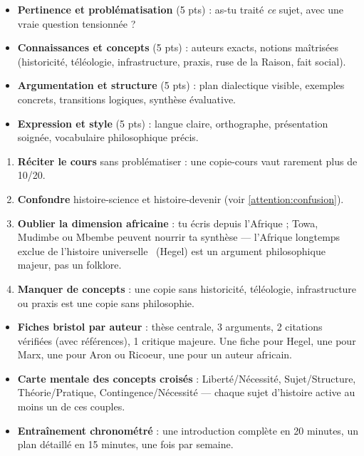 \documentclass[11pt]{article}
\newcommand{\cle}[1]{{\popxbold\color{popdark}#1}}
\begin{document}
\begin{aretenir}
\begin{itemize}
\item \textbf{Pertinence et problématisation} (5 pts) : as-tu traité \emph{ce} sujet, avec une vraie question tensionnée ?
\item \textbf{Connaissances et concepts} (5 pts) : auteurs exacts, notions maîtrisées (\cle{historicité}, \cle{téléologie}, \cle{infrastructure}, \cle{praxis}, \cle{ruse de la Raison}, \cle{fait social}).
\item \textbf{Argumentation et structure} (5 pts) : plan dialectique visible, exemples concrets, transitions logiques, synthèse évaluative.
\item \textbf{Expression et style} (5 pts) : langue claire, orthographe, présentation soignée, vocabulaire philosophique précis.
\end{itemize}
\end{aretenir}

\begin{attention}
\begin{enumerate}
\item \textbf{Réciter le cours} sans problématiser : une copie-cours vaut rarement plus de 10/20.
\item \textbf{Confondre} histoire-science et histoire-devenir (voir \ref{attention:confusion}).
\item \textbf{Oublier la dimension africaine} : tu écris depuis l'Afrique ; Towa, Mudimbe ou Mbembe peuvent nourrir ta synthèse — l'Afrique longtemps exclue de \guillemotleft l'histoire universelle \guillemotright\ (Hegel) est un argument philosophique majeur, pas un folklore.
\item \textbf{Manquer de concepts} : une copie sans \cle{historicité}, \cle{téléologie}, \cle{infrastructure} ou \cle{praxis} est une copie sans philosophie.
\end{enumerate}
\end{attention}

\begin{methode}
\begin{itemize}
\item \textbf{Fiches bristol par auteur} : thèse centrale, 3 arguments, 2 citations vérifiées (avec références), 1 critique majeure. Une fiche pour Hegel, une pour Marx, une pour Aron ou Ricoeur, une pour un auteur africain.
\item \textbf{Carte mentale des concepts croisés} : Liberté/Nécessité, Sujet/Structure, Théorie/Pratique, Contingence/Nécessité — chaque sujet d'histoire active au moins un de ces couples.
\item \textbf{Entraînement chronométré} : une introduction complète en 20 minutes, un plan détaillé en 15 minutes, une fois par semaine.
\end{itemize}
\end{methode}
\end{document}
